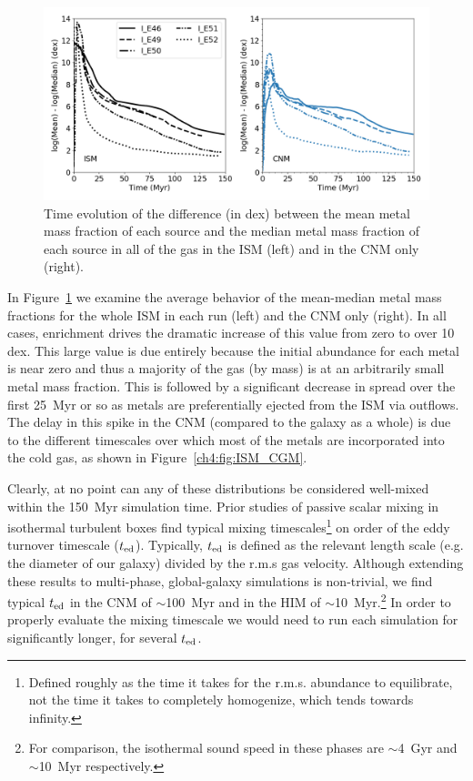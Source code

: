 \begin{figure}
  \centering
  \includegraphics[width=0.975\linewidth]{figures/ch4/ISM_CNM_average_mean-median}
  \caption{Time evolution of the difference (in dex) between the mean metal mass fraction of each source and the median metal mass fraction of each source in all of the gas in the ISM (left) and in the CNM only (right).}
  \label{ch4:fig:mean-median}
\end{figure}

In Figure~\ref{ch4:fig:mean-median} we examine the average behavior of the mean-median metal mass fractions for the whole ISM in each run (left) and the CNM only (right). In all cases, enrichment drives the dramatic increase of this value from zero to over 10 dex. This large value is due entirely because the initial abundance for each metal is near zero and thus a majority of the gas (by mass) is at an arbitrarily small metal mass fraction. This is followed by a significant decrease in spread over the first 25~Myr or so as metals are preferentially ejected from the ISM via outflows. The delay in this spike in the CNM (compared to the galaxy as a whole) is due to the different timescales over which most of the metals are incorporated into the cold gas, as shown in Figure~\ref{ch4:fig:ISM_CGM}.

Clearly, at no point can any of these distributions be considered well-mixed within the 150~Myr simulation time. Prior studies of passive scalar mixing in isothermal turbulent boxes find typical mixing timescales\footnote{Defined roughly as the time it takes for the r.m.s. abundance to equilibrate, not the time it takes to completely homogenize, which tends towards infinity.} on order of the eddy turnover timescale \citep[e.g.][]{SurPanScannapieco2014} ($t_{\rm ed}$). Typically, $t_{\rm ed}$ is defined as the relevant length scale (e.g. the diameter of our galaxy) divided by the r.m.s gas velocity. Although extending these results to multi-phase, global-galaxy simulations is non-trivial, we find typical $t_{\rm ed}$ in the CNM of $\sim$100~Myr and in the HIM of $\sim$10~Myr.\footnote{For comparison, the isothermal sound speed in these phases are $\sim$4~Gyr and $\sim$10~Myr respectively.} In order to properly evaluate the mixing timescale we would need to run each simulation for significantly longer, for several $t_{\rm ed}$.

